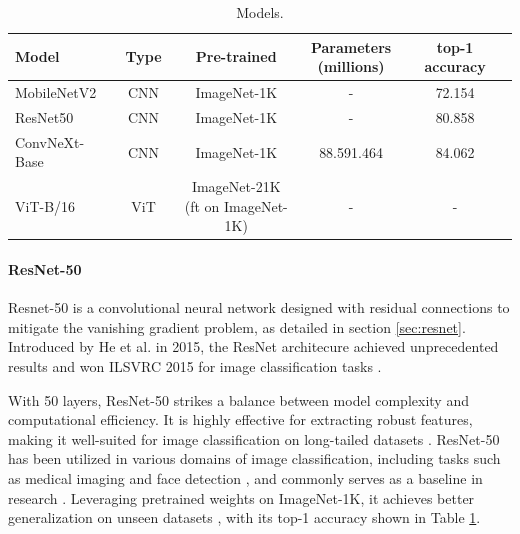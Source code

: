 \begin{table}[ht]
    \centering
    \caption{Models. }
    \scriptsize
    \begin{tabular}{lcccc}
    \toprule
    \textbf{Model} & \textbf{Type} & \textbf{Pre-trained} & \makecell{\textbf{Parameters} \\ \textbf{(millions)}} & \textbf{top-1 accuracy} \\
    \midrule
    MobileNetV2 \cite{sandler2018mobilenetv2} & CNN  & ImageNet-1K & - & 72.154 \cite{pytorch_mobilenetv2} \\
    ResNet50 \cite{he2015deepresiduallearningimage} & CNN & ImageNet-1K & - & 	
    80.858 \cite{torchvision-resnet} \\
    ConvNeXt-Base \cite{todi2023convnext}  & CNN & ImageNet-1K & 88.591.464 & 84.062 \cite{torchvision-resnet} \\
    ViT-B/16 \cite{dosovitskiy2021imageworth16x16words}   & ViT & \makecell{ImageNet-21K \\ (ft on ImageNet-1K)} & - & 	- \\
    \bottomrule
    \end{tabular}
    \label{tab:model_performance}
\end{table}



\paragraph{ResNet-50}
Resnet-50 \cite{he2015deepresiduallearningimage} is a convolutional neural network designed with residual connections to mitigate the vanishing gradient problem, as detailed in section \ref{sec:resnet}. Introduced by He et al. in 2015, the ResNet architecure achieved unprecedented results and won ILSVRC 2015 for image classification tasks \cite{ILSVRC15}. 

With 50 layers, ResNet-50 strikes a balance between model complexity and computational efficiency. It is highly effective for extracting robust features, making it well-suited for image classification on long-tailed datasets \cite{he2015deepresiduallearningimage}. ResNet-50 has been utilized in various domains of image classification, including tasks such as medical imaging \cite{huang2022identifyingkeycomponentsresnet50, Simegn} and face detection \cite{Nyarko2022}, and commonly serves as a baseline in research \cite{yun2019cutmixregularizationstrategytrain,cubuk2019randaugmentpracticalautomateddata,zhang2018mixupempiricalriskminimization,menon2021longtaillearninglogitadjustment}. Leveraging pretrained weights on ImageNet-1K, it achieves better generalization on unseen datasets \cite{resnettransfer,RAZAVI2024123276,chan2019transfer,Shafiq2022}, with its top-1 accuracy shown in Table \ref{tab:model_performance}. 

